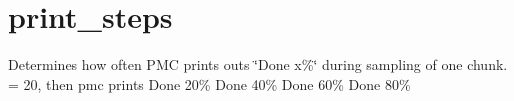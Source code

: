 \hypertarget{print__steps-example}{
\section{print\_\-steps}
}
Determines how often PMC prints outs \char`\"{}Done x\%\char`\"{} during sampling of one chunk. = 20, then pmc prints Done 20\% Done 40\% Done 60\% Done 80\%


\begin{DoxyCodeInclude}
\end{DoxyCodeInclude}
 